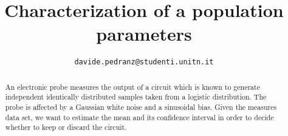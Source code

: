 \documentclass[conference]{IEEEtran}
\begin{document}
\title{Characterization of a population parameters}
\author{
	\texttt{davide.pedranz@studenti.unitn.it}
}

\maketitle

\begin{abstract}
An electronic probe measures the output of a circuit which is known to generate independent identically distributed samples taken from a logistic distribution.
The probe is affected by a Gaussian white noise and a sinusoidal bias.
Given the measures data set, we want to estimate the mean and its confidence interval in order to decide whether to keep or discard the circuit.
\end{abstract}

\acresetall











\end{document}
